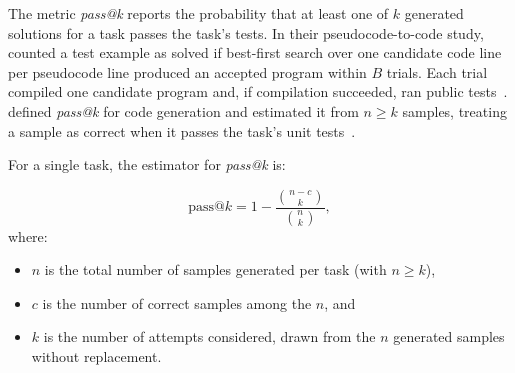 \documentclass[smallextended]{svjour3}
\begin{document}
The metric \emph{pass@k} reports the probability that at least one of $k$ generated solutions for a task passes the task's tests.
In their pseudocode-to-code study, \citeauthor{DBLP:conf/nips/KulalPC0PAL19} counted a test example as solved if best-first search over one candidate code line per pseudocode line produced an accepted program within $B$ trials.
Each trial compiled one candidate program and, if compilation succeeded, ran public tests~\cite{DBLP:conf/nips/KulalPC0PAL19}.
\citeauthor{DBLP:journals/corr/abs-2107-03374} defined \emph{pass@k} for code generation and estimated it from $n \ge k$ samples, treating a sample as correct when it passes the task's unit tests~\cite{DBLP:journals/corr/abs-2107-03374}.

For a single task, the estimator for \emph{pass@k} is:

\[
\text{pass@}k = 1 - \frac{\binom{n-c}{k}}{\binom{n}{k}},
\]
where:

\begin{itemize}
  \item $n$ is the total number of samples generated per task (with $n \ge k$),
  \item $c$ is the number of correct samples among the $n$, and
  \item $k$ is the number of attempts considered, drawn from the $n$ generated samples without replacement.
\end{itemize}
\end{document}
